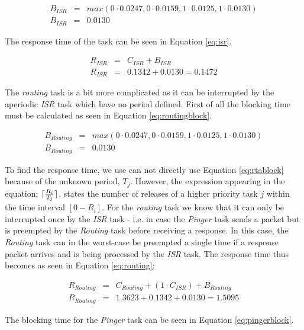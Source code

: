 \begin{eqnarray}
\label{eq:isrblock}
     B_{ISR} &=& max(0 \cdot 0.0247, 0 \cdot 0.0159, 1 \cdot 0.0125, 1 \cdot 0.0130) \nonumber \\
     B_{ISR} &=& 0.0130
\end{eqnarray}

The response time of the task can be seen in Equation \ref{eq:isr}.

\begin{eqnarray}
\label{eq:isr}
      R_{ISR} &=& C_{ISR} + B_{ISR} \nonumber \\
      R_{ISR} &=& 0.1342 + 0.0130 = 0.1472
\end{eqnarray}

The \textit{routing} task is a bit more complicated as it can be interrupted by the aperiodic \textit{ISR} task which have no period defined. First of all the blocking time must be calculated as seen in Equation \ref{eq:routingblock}.

\begin{eqnarray}
\label{eq:routingblock}
     B_{Routing} &=& max(0 \cdot 0.0247, 0 \cdot 0.0159, 1 \cdot 0.0125, 1 \cdot 0.0130) \nonumber \\
     B_{Routing} &=& 0.0130
\end{eqnarray}

To find the response time, we use can not directly use Equation \ref{eq:rtablock} because of the unknown period, $T_{j}$. However, the expression appearing in the equation; $\lceil\frac{R_{i}}{T_{j}}\rceil$, states the number of releases of a higher priority task $j$ within the time interval $[0-R_{i}]$. For the \textit{routing} task we know that it can only be interrupted once by the \textit{ISR} task - i.e. in case the \textit{Pinger} task sends a packet but is preempted by the \textit{Routing} task before receiving a response. In this case, the \textit{Routing} task can in the worst-case be preempted a single time if a response packet arrives and is being processed by the \textit{ISR} task. The response time thus becomes as seen in Equation \ref{eq:routing}:

\begin{eqnarray}
\label{eq:routing}
      R_{Routing} &=& C_{Routing} + (1 \cdot C_{ISR}) + B_{Routing} \nonumber \\
      R_{Routing} &=& 1.3623 + 0.1342 + 0.0130 = 1.5095
\end{eqnarray}

The blocking time for the \textit{Pinger} task can be seen in Equation \ref{eq:pingerblock}.

